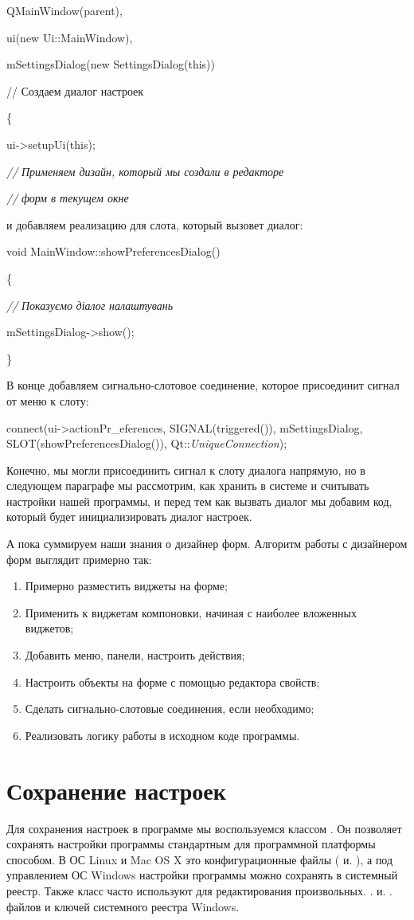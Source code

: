  QMainWindow(parent),

 ui(new Ui::MainWindow),

mSettingsDialog(new SettingsDialog(this))

// Создаем диалог настроек 

\{

ui-{>}setupUi(this);

\textit{//} \textit{Применяем дизайн, который мы создали в редакторе}\textit{ }

\textit{//} \textit{форм в текущем окне}\textit{ }

и добавляем реализацию для слота, который вызовет диалог: 

void MainWindow::showPreferencesDialog()

\{

 \textit{//} \textit{Показуємо} \textit{діалог} \textit{налаштувань}

 mSettingsDialog-{>}show();

\}

В конце добавляем сигнально-слотовое соединение, которое присоединит сигнал от меню к слоту: 

connect(ui-{>}actionPr\_eferences, SIGNAL(triggered()),  mSettingsDialog, SLOT(showPreferencesDialog()), 
Qt::\textit{UniqueConnection});

Конечно, мы могли присоединить сигнал к слоту  диалога напрямую, но в следующем параграфе мы
рассмотрим, как хранить в системе и считывать настройки нашей программы, и перед тем как вызвать диалог мы добавим код,
который будет инициализировать диалог настроек. 

А пока суммируем наши знания о дизайнер форм. Алгоритм работы с дизайнером форм выглядит примерно так:

\begin{enumerate}
\item Примерно разместить виджеты на форме;
\item Применить к виджетам компоновки, начиная с наиболее вложенных виджетов;
\item Добавить меню, панели, настроить действия;
\item Настроить объекты на форме с помощью редактора свойств;
\item Сделать сигнально-слотовые соединения, если необходимо;
\item Реализовать логику работы в исходном коде программы. 
\end{enumerate}
\section[\ Сохранение настроек]{ Сохранение настроек}
Для сохранения настроек в программе мы воспользуемся классом . Он позволяет сохранять настройки
программы стандартным для программной платформы способом. В ОС Linux и Mac OS X это конфигурационные файлы
( и. ), а под
управлением ОС Windows настройки программы можно сохранять в системный реестр. Также класс
 часто используют для редактирования произвольных.
. и. . файлов и ключей системного реестра
Windows.

